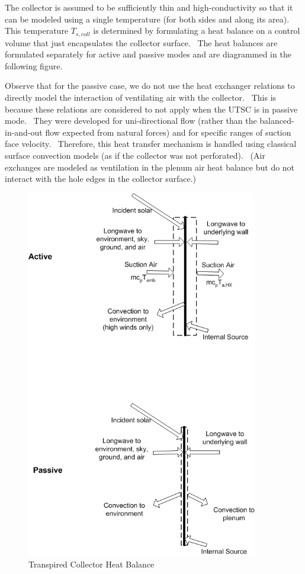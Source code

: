 The collector is assumed to be sufficiently thin and high-conductivity so that it can be modeled using a single temperature (for both sides and along its area).~ This temperature \({T_{s,coll}}\) is determined by formulating a heat balance on a control volume that just encapsulates the collector surface.~ The heat balances are formulated separately for active and passive modes and are diagrammed in the following figure.

Observe that for the passive case, we do not use the heat exchanger relations to directly model the interaction of ventilating air with the collector.~ This is because these relations are considered to not apply when the UTSC is in passive mode.~ They were developed for uni-directional flow (rather than the balanced-in-and-out flow expected from natural forces) and for specific ranges of suction face velocity.~ Therefore, this heat transfer mechanism is handled using classical surface convection models (as if the collector was not perforated).~ (Air exchanges are modeled as ventilation in the plenum air heat balance but do not interact with the hole edges in the collector surface.)

\begin{figure}[hbtp] %
\centering
\includegraphics[width=0.9\textwidth, height=0.9\textheight, keepaspectratio=true]{media/image6620.png}
\caption{Transpired Collector Heat Balance \protect \label{fig:transpired-collector-heat-balance}}
\end{figure}


